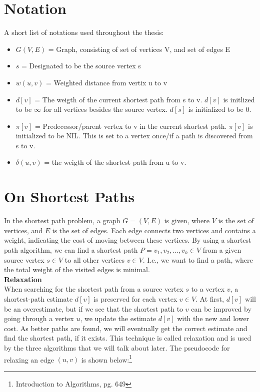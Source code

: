 \documentclass[11pt]{article}
\begin{document}
\section{Notation}
A short list of notations used throughout the thesis:\\
\begin{itemize}
\item $G(V,E)$ = Graph, consisting of set of vertices V, and set of edges E
\item $s$ = Designated to be the source vertex s
\item $w(u,v)$ = Weighted distance from vertix u to v
\item $d[v]$ = The weigth of the current shortest path from s to v. $d[v]$ is initlized to be $\infty$ for all vertices besides the source vertex. $d[s]$ is initialized to be 0.
\item $\pi[v]$ = Predecessor/parent vertex to v in the current shortest path. $\pi[v]$ is initialized to be NIL. This is set to a vertex once/if a path is discovered from s to v.
\item $\delta(u,v)$ = the weigth of the shortest path from u to v.
 
\end{itemize}
\section{On Shortest Paths}
In the shortest path problem, a graph $G = (V,E)$ is given, where $V$	
is the set of vertices, and $E$ is the set of edges. Each edge
connects two vertices and contains a weight, indicating the cost of
moving between these vertices. By using a shortest path algorithm, we
can find a shortest path $P = {v_{1}, v_{2}, ..., v_{k}} \in V$ from a
given source vertex $s \in V$ to all other vertices $v \in V$. I.e.,
we want to find a path, where the total weight of the visited edges is
minimal.\\

\noindent
\textbf{Relaxation}\\
When searching for the shortest path from a source vertex $s$ to a
vertex $v$, a shortest-path estimate $d[v]$ is preserved for each
vertex $v \in V$. At first, $d[v]$ will be an overestimate, but if we see that the shortest path to $v$ can be improved by going through a vertex $u$, we update the estimate $d[v]$ with the new and lower cost. As better paths are found, we will eventually get the correct estimate and find the shortest path, if it exists. This technique is called relaxation and is used by the three algorithms that we will talk about later. The pseudocode for relaxing an edge $(u,v) $ is shown below:\footnote{Introduction to Algorithms, pg. 649}\\
\end{document}
